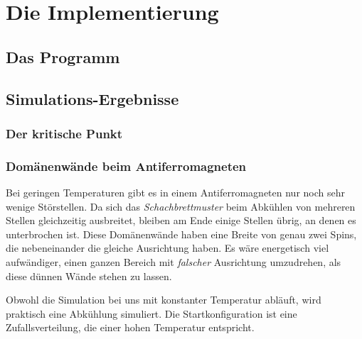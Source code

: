 \section{Die Implementierung}

\subsection{Das Programm}

\subsection{Simulations-Ergebnisse}

\subsubsection{Der kritische Punkt}

\subsubsection{Domänenwände beim Antiferromagneten}
Bei geringen Temperaturen gibt es in einem Antiferromagneten nur noch sehr wenige Störstellen.
Da sich das \textit{Schachbrettmuster} beim Abkühlen von mehreren Stellen gleichzeitig ausbreitet, bleiben am Ende einige Stellen übrig, an denen es unterbrochen ist. Diese Domänenwände haben eine Breite von genau zwei Spins, die nebeneinander die gleiche Ausrichtung haben.
Es wäre energetisch viel aufwändiger, einen ganzen Bereich mit \textit{falscher} Ausrichtung umzudrehen, als diese dünnen Wände stehen zu lassen.

Obwohl die Simulation bei uns mit konstanter Temperatur abläuft, wird praktisch eine Abkühlung simuliert.
Die Startkonfiguration ist eine Zufallsverteilung, die einer hohen Temperatur entspricht.

